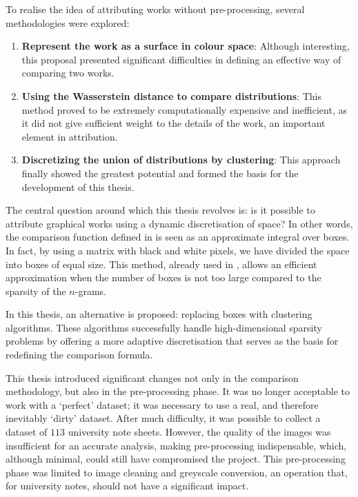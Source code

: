 \begin{toReview}
		\bigskip \noindent To realise the idea of attributing works without pre-processing, several methodologies were explored:

		\begin{enumerate}
			\item \textbf{Represent the work as a surface in colour space}: Although interesting, this proposal presented significant difficulties in defining an effective way of comparing two works.
			\item \textbf{Using the Wasserstein distance to compare distributions}: This method proved to be extremely computationally expensive and inefficient, as it did not give sufficient weight to the details of the work, an important element in attribution.
			\item \textbf{Discretizing the union of distributions by clustering}: This approach finally showed the greatest potential and formed the basis for the development of this thesis.
		\end{enumerate}

		\noindent The central question around which this thesis revolves is: is it possible to attribute graphical works using a dynamic discretisation of space? In other words, the comparison function defined in \cite{SapAttribution} is seen as an approximate integral over boxes. In fact, by using a matrix with black and white pixels, we have divided the space into boxes of equal size. This method, already used in \cite{thesis}, allows an efficient approximation when the number of boxes is not too large compared to the sparsity of the $n$-grams.

		\noindent In this thesis, an alternative is proposed: replacing boxes with clustering algorithms. These algorithms successfully handle high-dimensional sparsity problems by offering a more adaptive discretisation that serves as the basis for redefining the comparison formula.

		\bigskip \noindent This thesis introduced significant changes not only in the comparison methodology, but also in the pre-processing phase. It was no longer acceptable to work with a ‘perfect’ dataset; it was necessary to use a real, and therefore inevitably ‘dirty’ dataset. After much difficulty, it was possible to collect a dataset of $113$ university note sheets. However, the quality of the images was insufficient for an accurate analysis, making pre-processing indispensable, which, although minimal, could still have compromised the project. This pre-processing phase was limited to image cleaning and greyscale conversion, an operation that, for university notes, should not have a significant impact.


\end{toReview}
